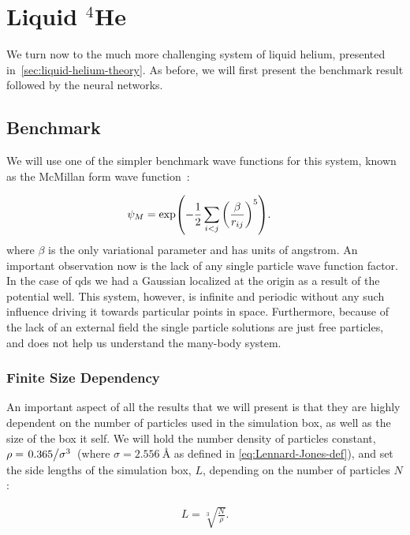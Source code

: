 \documentclass[Thesis.tex]{subfiles}
\begin{document}
\chapter{Liquid $^4$He}
\label{chp:liquid-helium}

We turn now to the much more challenging system of liquid helium, presented
in~\cref{sec:liquid-helium-theory}. As before, we will first present the
benchmark result followed by the neural networks.


\section{Benchmark}

We will use one of the simpler benchmark wave functions for this system, known
as the McMillan form wave function~\cite{McMillan-1965}:

\begin{align}
  \label{eq:McMillan-wave-function-def}
  \psi_{M} &= \exp(-\frac{1}{2}\sum_{i<j} \qty(\frac{\beta}{r_{ij}})^5).
\end{align}
where $\beta$ is the only variational parameter and has units of angstrom. An
important observation now is the lack of any single particle wave function
factor. In the case of \glspl{qd} we had a Gaussian localized at the origin
as a result of the potential well. This system, however, is infinite and
periodic without any such influence driving it towards particular points in
space. Furthermore, because of the lack of an external field the single particle
solutions are just free particles, and does not help us understand the many-body
system.

\subsection{Finite Size Dependency}

An important aspect of all the results that we will present is that they are
highly dependent on the number of particles used in the simulation box, as well
as the size of the box it self. We will hold the number density of particles
constant, $\rho = \flatfrac{\num{0.365}}{\sigma^3}$ (where $\sigma =
\SI{2.556}{\angstrom}$ as defined in \cref{eq:Lennard-Jones-def}), and set the
side lengths of the simulation box, $L$, depending on
the number of particles $N$:

\begin{align}
  L = \sqrt[3]{\frac{N}{\rho}}.
\end{align}
\end{document}
